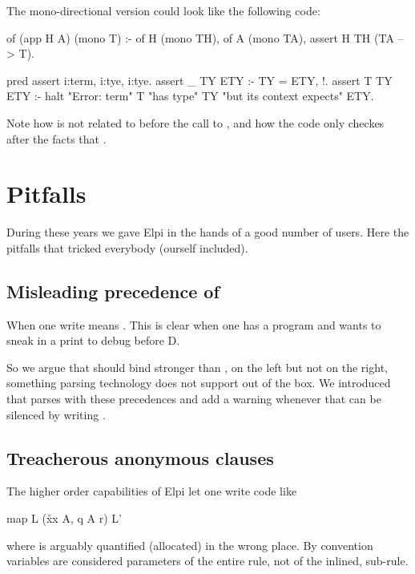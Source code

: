 \documentclass[a4paper, 11pt]{book}
\begin{document}
The mono-directional version could look like the following code:

\begin{elpicode}
of (app H A) (mono T) :-
  of H (mono TH),
  of A (mono TA),
  assert H TH (TA --> T).

pred assert i:term, i:tye, i:tye.
assert _ TY ETY :- TY = ETY, !.
assert T TY ETY :-
  halt "Error: term" T "has type" TY "but its context expects" ETY.
\end{elpicode}

Note how  is not related to  before the
call to  , and how the code only checkes
after the facts that .

\section{Pitfalls}

During these years we gave Elpi in the hands of a
good number of users. Here the pitfalls that tricked everybody (ourself included).

\subsection{Misleading precedence of \elpi{=>}}

When one write  means
. This is clear when
one has a program  and wants
to sneak in a print to debug before D.

So we argue that \elpi{=>} should bind stronger than ,
on the left but not on the right, something parsing
technology does not support out of the box. We introduced
\elpi{==>} that parses with these precedences and add a warning
whenever  that can be silenced
by writing .

\subsection{Treacherous anonymous clauses}

The higher order capabilities of Elpi let one write
code like
\begin{elpicode}
map L (x\r\p x A, q A r) L'
\end{elpicode}
where  is arguably quantified (allocated) in the
wrong place. By convention variables are considered parameters
of the entire rule, not of the inlined, sub-rule.
\end{document}
